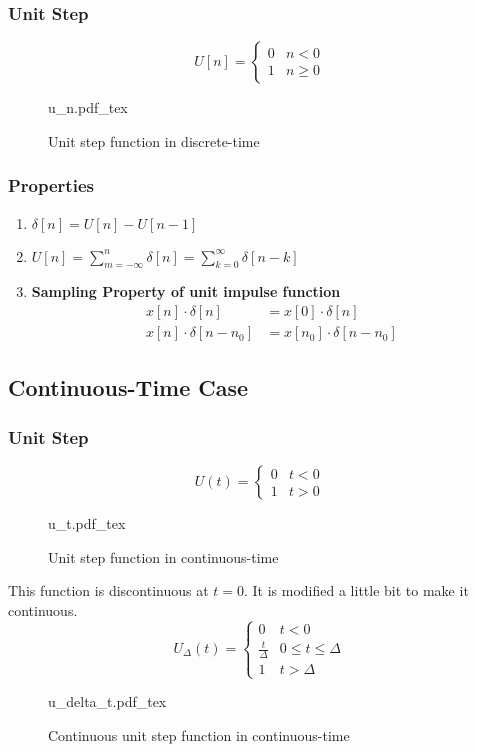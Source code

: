 \documentclass[oneside]{book}
\newcommand{\incfig}[1]{%
    {#1.pdf_tex}
}
\begin{document}
\subsubsection{Unit Step}
\[
	U[n] = \begin{cases}
		0 & n < 0    \\
		1 & n \geq 0
	\end{cases}
\]
\begin{figure}[ht]
	\centering
	\incfig{u_n}
	\caption{Unit step function in discrete-time}
\end{figure}
\subsubsection{Properties}
\begin{enumerate}
	\item \(\delta[n] = U[n] - U[n-1]\)
	\item \(U[n] = \sum\limits_{m = -\infty}^{n}\delta[n] = \sum\limits_{k = 0}^{\infty}\delta[n-k]\)
	\item \textbf{Sampling Property of unit impulse function}
	      \begin{align*}
		      x[n]\cdot\delta[n]     & = x[0]\cdot\delta[n]         \\
		      x[n]\cdot\delta[n-n_0] & = x[n_0]\cdot\delta[n - n_0]
	      \end{align*}
\end{enumerate}
\subsection{Continuous-Time Case}
\subsubsection{Unit Step}
\[
	U(t) = \begin{cases}
		0 & t < 0 \\
		1 & t > 0
	\end{cases}
\]
\begin{figure}[ht]
	\centering
	\incfig{u_t}
	\caption{Unit step function in continuous-time}
\end{figure}
This function is discontinuous at $t = 0$. It is modified a little bit to make it continuous.
\[
	U_\Delta(t) = \begin{cases}
		0                & t<0                 \\
		\frac{t}{\Delta} & 0\leq t \leq \Delta \\
		1                & t > \Delta
	\end{cases}
\]
\begin{figure}[ht]
	\centering
	\incfig{u_delta_t}
	\caption{Continuous unit step function in continuous-time}
\end{figure}
\end{document}
